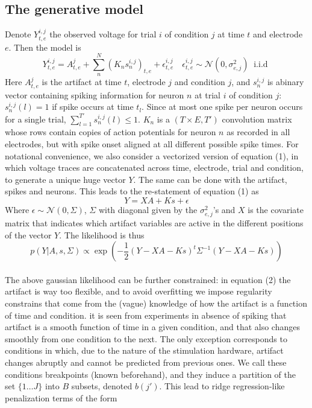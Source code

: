 \documentclass[12pt,letterpaper,fleqn]{article}
\begin{document}
\subsection{The generative model}
 Denote $Y_{t,e}^{i,j}$ the observed voltage for trial $i$ of condition $j$ at time $t$ and electrode $e$. Then the model is
\begin{equation} Y_{t,e}^{i,j}=A_{t,e}^j+\sum_n^N (K_n s_n^{i,j})_{t,e}+\epsilon_{t,e}^{i,j}\quad\epsilon_{t,e}^{i,j} \sim \mathcal{N}\left(0,\sigma^2_{e,j}\right) \;\; \text{i.i.d }\end{equation}
Here $A_{t,e}^j$  is the artifact at time $t$, electrode $j$ and condition $j$, and $s_n^{i,j}$ is abinary vector containing spiking information for neuron $n$ at trial $i$ of condition $j$: $s_n^{i,j}(l)=1$ if spike occurs at time $t_{l}$. Since at most one spike per neuron occurs for a single trial, $ \sum_{l=1}^{T'}s_n^{i,j}(l)\leq1$. $K_n$ is a $(T\times E, T')$ convolution matrix whose rows contain copies of action potentials for neuron $n$ as recorded in all electrodes, but with spike onset aligned at all different possible spike times. For notational convenience, we also consider a vectorized version of equation (1), in which voltage traces are concatenated across time, electrode, trial and condition, to generate a unique huge vector $Y$. The same can be done with the artifact, spikes and neurons. This leads to the re-statement of equation (1) as
\begin{equation}
Y=XA+Ks+\epsilon
\end{equation}
Where $\epsilon \sim \mathcal{N}(0,\Sigma)$, $\Sigma$ with diagonal given by the $\sigma^2_{e,j}$'s  and $X$ is the covariate matrix that indicates which artifact variables are active in the different positions of the vector $Y$. The likelihood is thus
$$p(Y|A,s,\Sigma)\propto \exp\left(-\dfrac{1}{2}(Y-XA-Ks)^t\Sigma^{-1}(Y-XA-Ks)\right)$$
\\ The above gaussian likelihood can be further constrained: in equation (2) the artifact is way too flexible, and to avoid overfitting we impose regularity constrains that come from the (vague) knowledge of how the artifact is a function of time and condition. it is seen from experiments in absence of spiking that artifact is a smooth function of time in a given condition, and that also changes smoothly from one condition to the next. The only exception corresponds to conditions in which, due to the nature of the stimulation hardware, artifact changes abruptly and cannot be predicted from previous ones. We call these conditions breakpoints (known beforehand), and they induce a partition of the set $\{1\ldots J\}$ into $B$ subsets, denoted $b(j')$. This lead to ridge regression-like penalization terms of the form
\end{document}
